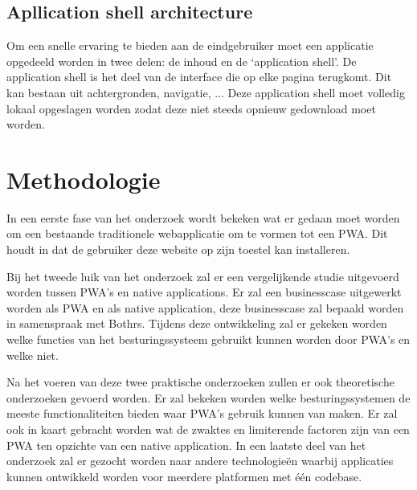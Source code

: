 \subsection{Apllication shell architecture}
Om een snelle ervaring te bieden aan de eindgebruiker moet een applicatie opgedeeld worden in twee delen: de inhoud en de ‘application shell’.
De application shell is het deel van de interface die op elke pagina terugkomt. Dit kan bestaan uit achtergronden, navigatie, ...
Deze application shell moet volledig lokaal opgeslagen worden zodat deze niet steeds opnieuw gedownload moet worden.
\autocite{Hiltunen2018}




\section{Methodologie}
\label{sec:methodologie}

In een eerste fase van het onderzoek wordt bekeken wat er gedaan moet worden om een bestaande traditionele webapplicatie om te vormen tot een PWA. Dit houdt in dat de gebruiker deze website op zijn toestel kan installeren. 

Bij het tweede luik van het onderzoek zal er een vergelijkende studie uitgevoerd worden tussen PWA's en native applications. Er zal een businesscase uitgewerkt worden als PWA en als native application, deze businesscase zal bepaald worden in samenspraak met Bothrs. 
Tijdens deze ontwikkeling zal er gekeken worden welke functies van het besturingssysteem gebruikt kunnen worden door PWA's en welke niet.

Na het voeren van deze twee praktische onderzoeken zullen er ook theoretische onderzoeken gevoerd worden. 
Er zal bekeken worden welke besturingssystemen de meeste functionaliteiten bieden waar PWA's gebruik kunnen van maken. 
Er zal ook in kaart gebracht worden wat de zwaktes en limiterende factoren zijn van een PWA ten opzichte van een native application.
In een laatste deel van het onderzoek zal er gezocht worden naar andere technologieën waarbij applicaties kunnen ontwikkeld worden voor meerdere platformen met één codebase.


